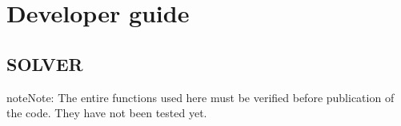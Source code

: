 \documentclass[letterpaper,10pt,english]{sphinxmanual}
\begin{document}
\sphinxstepscope


\section{Developer guide}
\label{\detokenize{developer_guide:developer-guide}}\label{\detokenize{developer_guide::doc}}
\sphinxstepscope


\subsection{SOLVER}
\label{\detokenize{SOLVER_doc:solver}}\label{\detokenize{SOLVER_doc::doc}}
\begin{sphinxadmonition}{note}{Note:}
\sphinxAtStartPar
The entire functions used here must be verified before publication of the code. They have not been tested yet.
\end{sphinxadmonition}


\subsubsection{}
\label{\detokenize{SOLVER_doc:functions}}
\end{document}
